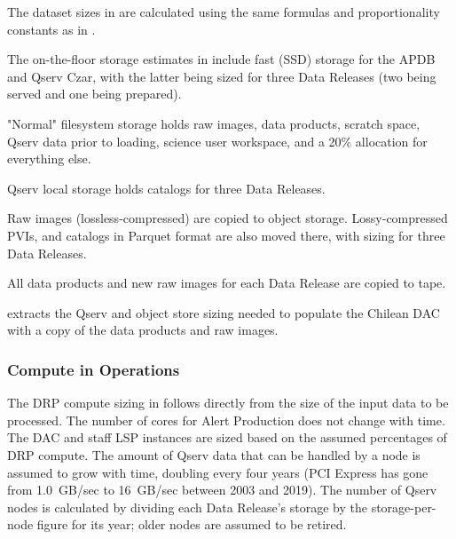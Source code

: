 The dataset sizes in  are calculated using the same formulas and proportionality constants as in .

\afterpage{
  \clearpage
  \begin{landscape}
      
      
      
  \end{landscape}
  \clearpage
}

The on-the-floor storage estimates in  include fast (SSD) storage for the APDB and Qserv Czar, with the latter being sized for three Data Releases (two being served and one being prepared).

"Normal" filesystem storage holds raw images, data products, scratch space, Qserv data prior to loading, science user workspace, and a 20\% allocation for everything else.

Qserv local storage holds catalogs for three Data Releases.

Raw images (lossless-compressed) are copied to object storage.
Lossy-compressed PVIs, and catalogs in Parquet format are also moved there, with sizing for three Data Releases.

All data products and new raw images for each Data Release are copied to tape.

 extracts the Qserv and object store sizing needed to populate the Chilean DAC with a copy of the data products and raw images.

\subsubsection{Compute in Operations}

The DRP compute sizing in  follows directly from the size of the input data to be processed.
The number of cores for Alert Production does not change with time.
The DAC and staff LSP instances are sized based on the assumed percentages of DRP compute.
The amount of Qserv data that can be handled by a node is assumed to grow with time, doubling every four years (PCI Express has gone from 1.0~GB/sec to 16~GB/sec between 2003 and 2019).
The number of Qserv nodes is calculated by dividing each Data Release's storage by the storage-per-node figure for its year; older nodes are assumed to be retired.
